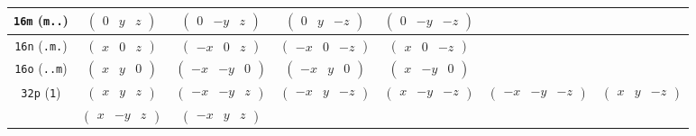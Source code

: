 \documentclass[fleqn,9pt,landscape]{jsarticle}
\begin{document}
\begin{center}
\begin{longtable}{ccccccc}
{\tt 16m} ({\tt m..}) & $ \begin{pmatrix} 0 & y & z \end{pmatrix} $ & $ \begin{pmatrix} 0 & - y & z \end{pmatrix} $ & $ \begin{pmatrix} 0 & y & - z \end{pmatrix} $ & $ \begin{pmatrix} 0 & - y & - z \end{pmatrix} $ & $  $ & $  $ \\ \hline
{\tt 16n} ({\tt .m.}) & $ \begin{pmatrix} x & 0 & z \end{pmatrix} $ & $ \begin{pmatrix} - x & 0 & z \end{pmatrix} $ & $ \begin{pmatrix} - x & 0 & - z \end{pmatrix} $ & $ \begin{pmatrix} x & 0 & - z \end{pmatrix} $ & $  $ & $  $ \\ \hline
{\tt 16o} ({\tt ..m}) & $ \begin{pmatrix} x & y & 0 \end{pmatrix} $ & $ \begin{pmatrix} - x & - y & 0 \end{pmatrix} $ & $ \begin{pmatrix} - x & y & 0 \end{pmatrix} $ & $ \begin{pmatrix} x & - y & 0 \end{pmatrix} $ & $  $ & $  $ \\ \hline
{\tt 32p} ({\tt 1}) & $ \begin{pmatrix} x & y & z \end{pmatrix} $ & $ \begin{pmatrix} - x & - y & z \end{pmatrix} $ & $ \begin{pmatrix} - x & y & - z \end{pmatrix} $ & $ \begin{pmatrix} x & - y & - z \end{pmatrix} $ & $ \begin{pmatrix} - x & - y & - z \end{pmatrix} $ & $ \begin{pmatrix} x & y & - z \end{pmatrix} $ \\
& $ \begin{pmatrix} x & - y & z \end{pmatrix} $ & $ \begin{pmatrix} - x & y & z \end{pmatrix} $ & $  $ & $  $ & $  $ & $  $ \\
\end{longtable}
\end{center}
\end{document}
